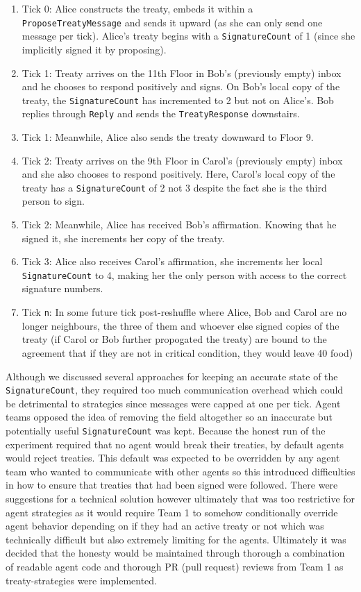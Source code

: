 \documentclass{article}
\begin{document}
\begin{enumerate}
    \item Tick 0: Alice constructs the treaty, embeds it within a \texttt{ProposeTreatyMessage} and sends it upward (as she can only send one message per tick). Alice's treaty begins with a \texttt{SignatureCount} of 1 (since she implicitly signed it by proposing).
    \item Tick 1: Treaty arrives on the 11th Floor in Bob's (previously empty) inbox and he chooses to respond positively and signs. On Bob's local copy of the treaty, the \texttt{SignatureCount} has incremented to 2 but not on Alice's. Bob replies through \texttt{Reply} and sends the  \texttt{TreatyResponse} downstairs.
    \item Tick 1: Meanwhile, Alice also sends the treaty downward to Floor 9.
    \item Tick 2: Treaty arrives on the 9th Floor in Carol's (previously empty) inbox and she also chooses to respond positively. \newline
    Here, Carol's local copy of the treaty has a \texttt{SignatureCount} of 2 not 3 despite the fact she is the third person to sign.
    \item Tick 2: Meanwhile, Alice has received Bob's affirmation. Knowing that he signed it, she increments her copy of the treaty.
    \item Tick 3: Alice also receives Carol's affirmation, she increments her local \texttt{SignatureCount} to 4, making her the only person with access to the correct signature numbers.
    \item Tick \texttt{n}: In some future tick post-reshuffle where Alice, Bob and Carol are no longer neighbours, the three of them and whoever else signed copies of the treaty (if Carol or Bob further propogated the treaty) are bound to the agreement that if they are not in critical condition, they would leave 40 food)
\end{enumerate}
Although we discussed several approaches for keeping an accurate state of the \texttt{SignatureCount}, they required too much communication overhead which could be detrimental to strategies since messages were capped at one per tick. Agent teams opposed the idea of removing the field altogether so an inaccurate but potentially useful \texttt{SignatureCount} was kept. \newline
Because the honest run of the experiment required that no agent would break their treaties, by default agents would reject treaties. This default was expected to be overridden by any agent team who wanted to communicate with other agents so this introduced difficulties in how to ensure that treaties that had been signed were followed. There were suggestions for a technical solution however ultimately that was too restrictive for agent strategies as it would require Team 1 to somehow conditionally override agent behavior depending on if they had an active treaty or not which was technically difficult but also extremely limiting for the agents. Ultimately it was decided that the honesty would be maintained through thorough a combination of readable agent code and thorough PR (pull request) reviews from Team 1 as treaty-strategies were implemented. \newline
\end{document}
